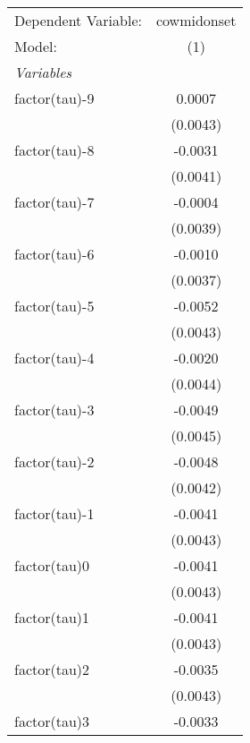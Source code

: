 \begingroup
\centering
\begin{tabular}{lc}
   \tabularnewline \midrule \midrule
   Dependent Variable:             & cowmidonset\\  
   Model:                          & (1)\\  
   \midrule
   \emph{Variables}\\
   factor(tau)-9                   & 0.0007\\   
                                   & (0.0043)\\   
   factor(tau)-8                   & -0.0031\\   
                                   & (0.0041)\\   
   factor(tau)-7                   & -0.0004\\   
                                   & (0.0039)\\   
   factor(tau)-6                   & -0.0010\\   
                                   & (0.0037)\\   
   factor(tau)-5                   & -0.0052\\   
                                   & (0.0043)\\   
   factor(tau)-4                   & -0.0020\\   
                                   & (0.0044)\\   
   factor(tau)-3                   & -0.0049\\   
                                   & (0.0045)\\   
   factor(tau)-2                   & -0.0048\\   
                                   & (0.0042)\\   
   factor(tau)-1                   & -0.0041\\   
                                   & (0.0043)\\   
   factor(tau)0                    & -0.0041\\   
                                   & (0.0043)\\   
   factor(tau)1                    & -0.0041\\   
                                   & (0.0043)\\   
   factor(tau)2                    & -0.0035\\   
                                   & (0.0043)\\   
   factor(tau)3                    & -0.0033\\   

\end{tabular}
